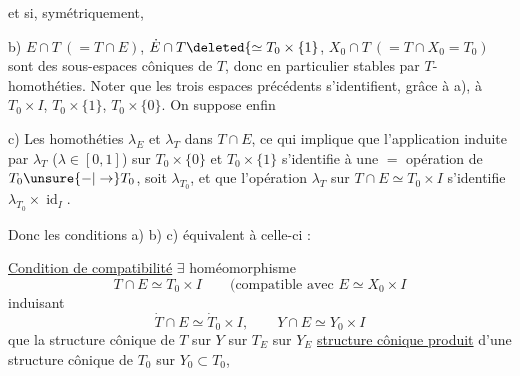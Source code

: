 

et si, symétriquement,

b) $E\cap T\ (=T\cap E)$, $\dot E\cap T\deleted{\simeq T_0\times\{1}$,
$X_0\cap T\ (=T\cap X_0=T_0)$ sont des
sous-espaces côniques de $T$, donc en particulier
stables par $T$-homothéties.  Noter que
les trois espaces précédents s'identifient, grâce à a),
à $T_0\times I$, $T_0\times\{1\}$, $T_0\times\{0\}$. On suppose enfin

c) Les homothéties  $\lambda_E$ et $\lambda_T$ 
dans $T\cap E$, ce qui implique que l'application
 induite par $\lambda_T$ ($\lambda\in[0,1]$) sur
$T_0\times\{0\}$ et $T_0\times\{1\}$
s'identifie à une $=$  opération de
$T_0\unsure{-|\to}T_0$,  soit $\lambda_{T_0}$, et que l'opération
$\lambda_T$ sur $T\cap E\simeq T_0\times I$ s'identifie 
 $\lambda_{T_0}\times\operatorname{id}_I$.

Donc les conditions a) b) c) équivalent à celle-ci :

\uline{Condition de compatibilité} $\exists$ homéomorphisme
\[
T\cap E\simeq T_0\times I
\qquad\text{(compatible avec }E\simeq X_0\times I
\]
induisant
\[
\dot T\cap E\simeq\dot T_0\times I,\qquad Y\cap E\simeq Y_0\times I
\]
 que la structure cônique de $T$ sur $Y$
 sur $T_E$ sur $Y_E$
 
\uline{structure cônique produit} 
d'une structure cônique de
$T_0$ sur $Y_0\subset T_0$, 

